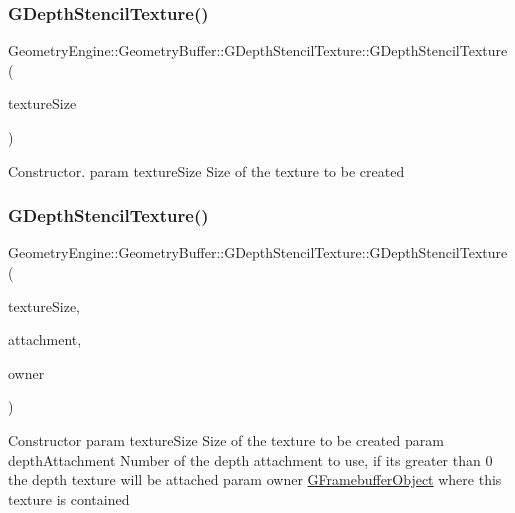 \subsubsection{\texorpdfstring{GDepthStencilTexture()}{GDepthStencilTexture()}\hspace{0.1cm}{\footnotesize\ttfamily [1/3]}}
{\footnotesize\ttfamily Geometry\+Engine\+::\+Geometry\+Buffer\+::\+G\+Depth\+Stencil\+Texture\+::\+G\+Depth\+Stencil\+Texture (\begin{DoxyParamCaption}\item[{const Q\+Vector2D \&}]{texture\+Size }\end{DoxyParamCaption})}

Constructor. param texture\+Size Size of the texture to be created \mbox{\label{class_geometry_engine_1_1_geometry_buffer_1_1_g_depth_stencil_texture_a03bf1c5b969afa4dbf5a7c53b6c9a58a}} 
\subsubsection{\texorpdfstring{GDepthStencilTexture()}{GDepthStencilTexture()}\hspace{0.1cm}{\footnotesize\ttfamily [2/3]}}
{\footnotesize\ttfamily Geometry\+Engine\+::\+Geometry\+Buffer\+::\+G\+Depth\+Stencil\+Texture\+::\+G\+Depth\+Stencil\+Texture (\begin{DoxyParamCaption}\item[{const Q\+Vector2D \&}]{texture\+Size,  }\item[{G\+Framebuffer\+Commons\+::\+G\+\_\+\+D\+E\+P\+T\+H\+\_\+\+S\+T\+E\+N\+C\+I\+L\+\_\+\+A\+T\+T\+A\+C\+H\+M\+E\+N\+TS}]{attachment,  }\item[{const \mbox{\hyperlink{class_geometry_engine_1_1_geometry_buffer_1_1_g_framebuffer_object}{G\+Framebuffer\+Object}} $\ast$}]{owner }\end{DoxyParamCaption})}

Constructor param texture\+Size Size of the texture to be created param depth\+Attachment Number of the depth attachment to use, if it\textquotesingle{}s greater than 0 the depth texture will be attached param owner \mbox{\hyperlink{class_geometry_engine_1_1_geometry_buffer_1_1_g_framebuffer_object}{G\+Framebuffer\+Object}} where this texture is contained \mbox{\label{class_geometry_engine_1_1_geometry_buffer_1_1_g_depth_stencil_texture_a32fd061895c2acd68316c4135607b25c}} 
